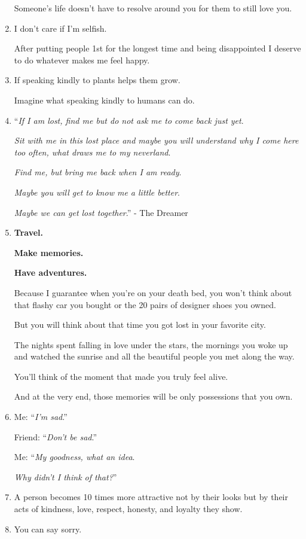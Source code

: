 \documentclass{article}
\begin{document}
\begin{enumerate}
	Someone's life doesn't have to resolve around you for them to still love you.
	\item I don't care if I'm selfish.
	
	After putting people 1st for the longest time and being disappointed I deserve to do whatever makes me feel happy.
	\item If speaking kindly to plants helps them grow.
	
	Imagine what speaking kindly to humans can do.
	\item ``\textit{If I am lost, find me but do not ask me to come back just yet}.
	
	\textit{Sit with me in this lost place and maybe you will understand why I come here too often, what draws me to my neverland}.
	
	\textit{Find me, but bring me back when I am ready}.
	
	\textit{Maybe you will get to know me a little better}.
	
	\textit{Maybe we can get lost together}.'' - The Dreamer
	\item \textbf{Travel.}
	
	\textbf{Make memories.}
	
	\textbf{Have adventures.}
	
	Because I guarantee when you're on your death bed, you won't think about that flashy car you bought or the 20 pairs of designer shoes you owned.
	
	But you will think about that time you got lost in your favorite city.
	
	The nights spent falling in love under the stars, the mornings you woke up and watched the sunrise and all the beautiful people you met along the way.
	
	You'll think of the moment that made you truly feel alive.
	
	And at the very end, those memories will be only possessions that you own.
	\item Me: ``\textit{I'm sad}.''
	
	Friend: ``\textit{Don't be sad}.''
	
	Me: ``\textit{My goodness, what an idea}.
	
	\textit{Why didn't I think of that?}''
	\item A person becomes 10 times more attractive not by their looks but by their acts of kindness, love, respect, honesty, and loyalty they show.
	\item You can say sorry.
	

\end{enumerate}
\end{document}
